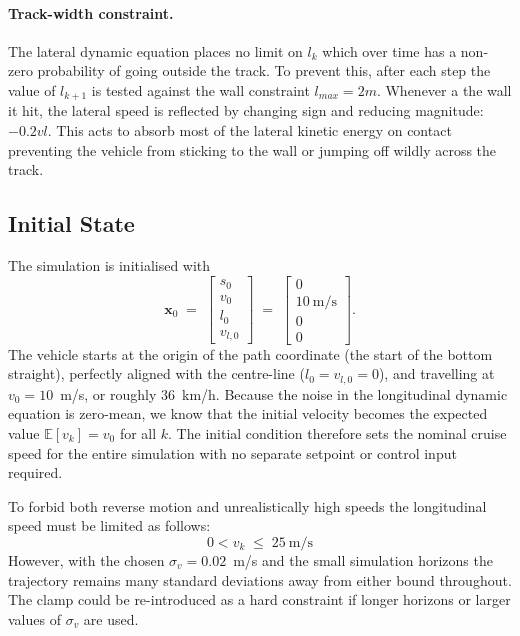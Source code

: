 \paragraph{Track-width constraint.}
The lateral dynamic equation places no limit on $l_k$ which over time has a non-zero probability of going outside the track. To prevent this, after each step the value of $l_{k+1}$ is tested against the wall constraint $l_{max} =2m$. Whenever a the wall it hit, the lateral speed is reflected by changing sign and reducing magnitude: $-0.2vl$. This acts to absorb most of the lateral kinetic energy on contact preventing the vehicle from sticking to the wall or jumping off wildly across the track.

\subsection{Initial State}
\label{subsec:initial}

The simulation is initialised with
\begin{equation}
    \mathbf{x}_0 \;=\; \begin{bmatrix} s_0 \\ v_0 \\ l_0 \\ v_{l,0} \end{bmatrix}
    \;=\; \begin{bmatrix} 0 \\ 10~\text{m/s} \\ 0 \\ 0 \end{bmatrix}.
    \label{eq:x0}
\end{equation}
The vehicle starts at the origin of the path coordinate (the start of the bottom straight), perfectly aligned with the centre-line ($l_0 = v_{l,0} = 0$), and travelling at $v_0 = 10$~m/s, or roughly $36$~km/h. Because the noise in the longitudinal dynamic equation is zero-mean, we know that the initial velocity becomes the expected value  $\mathbb{E}[v_k] = v_0$ for all $k$. The initial condition therefore sets the nominal cruise speed for the entire simulation with no separate setpoint or control input required.

To forbid both reverse motion and unrealistically high speeds the longitudinal speed must be limited as follows:
\begin{equation}
    0 < v_k \;\leq\; 25~\text{m/s}
\end{equation}
However, with the chosen $\sigma_v = 0.02$~m/s and the small simulation horizons the trajectory remains many standard deviations away from either bound throughout. The clamp could be re-introduced as a hard constraint if longer horizons or larger values of $\sigma_v$ are used.

